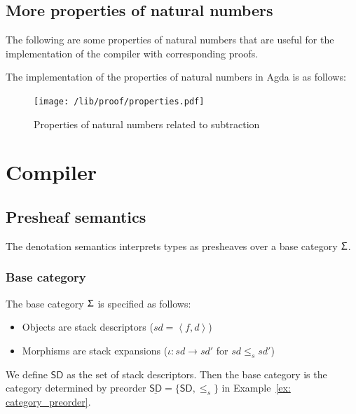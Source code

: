 \documentclass[12pt,twoside,a4paper]{report}
\theoremstyle{definition}
\theoremstyle{definition}
\theoremstyle{definition}
\theoremstyle{definition}
\newcommand{\ang}[1]{\left\langle #1 \right\rangle}
\begin{document}
    \subsection{More properties of natural numbers}
    The following are some properties of natural numbers that are useful for the implementation of the compiler with corresponding proofs.

    The implementation of the properties of natural numbers in Agda is as follows:
    \begin{figure}[H]
        \centering
        \texttt{[image: /lib/proof/properties.pdf]}
        \caption{Properties of natural numbers related to subtraction}
        \label{fig: properties_subtraction}
    \end{figure}


    

    \section{Compiler}
    \subsection{Presheaf semantics}
    The denotation semantics interprets types as presheaves over a base category $\Upsigma$. 
    \subsubsection{Base category}
    The base category $\Upsigma$ is specified as follows:
    \begin{itemize}
        \item Objects are stack descriptors ($sd = \ang{f, d}$)
        \item Morphisms are stack expansions ($\iota : sd \to sd'$ for $sd \leq_s sd'$) 
    \end{itemize}
    We define $\mathsf{SD}$ as the set of stack descriptors. Then the base category is the category determined by preorder $\underline{\mathsf{SD}} = \{\mathsf{SD}, \leq_s\}$ in Example~\ref{ex: category_preorder}.
\end{document}
